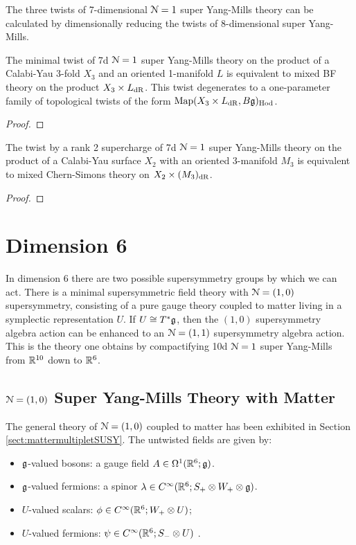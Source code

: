 \documentclass[10pt, oneside]{article}
\begin{document}
The three twists of 7-dimensional $\mathcal{N}=1$ super Yang-Mills theory can be calculated by dimensionally reducing the twists of 8-dimensional super Yang-Mills.

\begin{theorem} \label{7d_holo_twist_thm}
The minimal twist of 7d $\mathcal{N}=1$ super Yang-Mills theory on the product of a Calabi-Yau 3-fold $X_3$ and an oriented 1-manifold $L$ is equivalent to mixed BF theory on the product $X_3 \times L_{\mathrm{dR}}$. This twist degenerates to a one-parameter family of topological twists of the form $\operatorname{Map}(X_3 \times L_{\mathrm{dR}}, B\mathfrak{g})_{\mathrm{Hod}}$.
\end{theorem}

\begin{proof}
 
\end{proof}

\begin{theorem} \label{7d_rank2_twist_thm}
The twist by a rank 2 supercharge of 7d $\mathcal{N}=1$ super Yang-Mills theory on the product of a Calabi-Yau surface $X_2$ with an oriented 3-manifold $M_3$ is equivalent to mixed Chern-Simons theory on $X_2 \times (M_3)_{\mathrm{dR}}$. 
\end{theorem}

\begin{proof}
 
\end{proof}

\section{Dimension 6}
In dimension 6 there are two possible supersymmetry groups by which we can act.  
There is a minimal supersymmetric field theory with $\mathcal{N}=(1,0)$ supersymmetry, consisting of a pure gauge theory coupled to matter living in a symplectic representation $U$.  
If $U \cong T^*\mathfrak{g}$, then the $(1,0)$ supersymmetry algebra action can be enhanced to an $\mathcal{N}=(1,1)$ supersymmetry algebra action.  
This is the theory one obtains by compactifying 10d $\mathcal{N}=1$ super Yang-Mills from $\mathbb R^{10}$ down to $\mathbb R^6$.

\subsection{$\mathcal{N} = (1,0)$ Super Yang-Mills Theory with Matter} \label{6d_10_section}

The general theory of $\mathcal{N} = (1,0)$ coupled to matter has been exhibited in Section \ref{sect:mattermultipletSUSY}. 
The untwisted fields are given by:
\begin{itemize}
\item $\mathfrak g$-valued bosons: a gauge field $A \in \Omega^1(\mathbb R^6;\mathfrak g)$.
\item $\mathfrak g$-valued fermions: a spinor $\lambda \in C^\infty(\mathbb R^6 ; S_+ \otimes W_+ \otimes \mathfrak g)$. 
\item $U$-valued scalars: $\phi \in C^\infty(\mathbb R^6 ; W_+ \otimes U)$;
\item $U$-valued fermions: $\psi \in C^\infty(\mathbb R^6 ; S_- \otimes U)$ .
\end{itemize}
\end{document}
